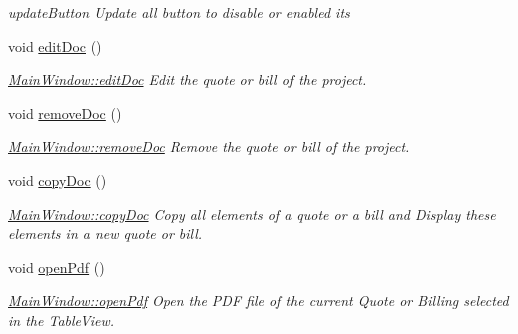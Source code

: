 \begin{DoxyCompactItemize}
\begin{DoxyCompactList}\small\item\em update\-Button Update all button to disable or enabled its \end{DoxyCompactList}\item 
\hypertarget{classGui_1_1MainWindow_a06bc679c41574cb679c6e5e7b673139c}{void \hyperlink{classGui_1_1MainWindow_a06bc679c41574cb679c6e5e7b673139c}{edit\-Doc} ()}\label{classGui_1_1MainWindow_a06bc679c41574cb679c6e5e7b673139c}

\begin{DoxyCompactList}\small\item\em \hyperlink{classGui_1_1MainWindow_a06bc679c41574cb679c6e5e7b673139c}{Main\-Window\-::edit\-Doc} Edit the quote or bill of the project. \end{DoxyCompactList}\item 
\hypertarget{classGui_1_1MainWindow_af86458ad953cb70fb7a88245a6047550}{void \hyperlink{classGui_1_1MainWindow_af86458ad953cb70fb7a88245a6047550}{remove\-Doc} ()}\label{classGui_1_1MainWindow_af86458ad953cb70fb7a88245a6047550}

\begin{DoxyCompactList}\small\item\em \hyperlink{classGui_1_1MainWindow_af86458ad953cb70fb7a88245a6047550}{Main\-Window\-::remove\-Doc} Remove the quote or bill of the project. \end{DoxyCompactList}\item 
\hypertarget{classGui_1_1MainWindow_adf1e721c73626d1810dd90c84920dcde}{void \hyperlink{classGui_1_1MainWindow_adf1e721c73626d1810dd90c84920dcde}{copy\-Doc} ()}\label{classGui_1_1MainWindow_adf1e721c73626d1810dd90c84920dcde}

\begin{DoxyCompactList}\small\item\em \hyperlink{classGui_1_1MainWindow_adf1e721c73626d1810dd90c84920dcde}{Main\-Window\-::copy\-Doc} Copy all elements of a quote or a bill and Display these elements in a new quote or bill. \end{DoxyCompactList}\item 
\hypertarget{classGui_1_1MainWindow_a6fc6c0f088d3996ad941705a13d7aaae}{void \hyperlink{classGui_1_1MainWindow_a6fc6c0f088d3996ad941705a13d7aaae}{open\-Pdf} ()}\label{classGui_1_1MainWindow_a6fc6c0f088d3996ad941705a13d7aaae}

\begin{DoxyCompactList}\small\item\em \hyperlink{classGui_1_1MainWindow_a6fc6c0f088d3996ad941705a13d7aaae}{Main\-Window\-::open\-Pdf} Open the P\-D\-F file of the current Quote or Billing selected in the Table\-View. \end{DoxyCompactList}\end{DoxyCompactItemize}
